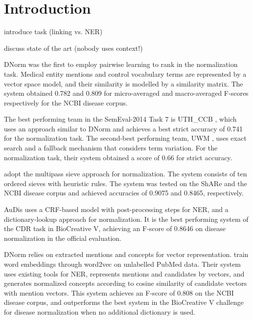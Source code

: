 \documentclass{bioinfo}
\begin{document}
\section{Introduction}

introduce task (linking vs. NER)

discuss state of the art (nobody uses context!)



DNorm \citep{leaman-et-al:2013} was the first to employ pairwise learning to rank in the normalization task.
Medical entity mentions and control vocabulary terms are represented by a vector space model, and their similarity is modelled by a similarity matrix.
The system obtained 0.782 and 0.809 for micro-averaged and macro-averaged F-scores respectively for the NCBI disease corpus.  %

The best performing team in the SemEval-2014 Task 7 is UTH\_CCB \citep{zhang-et-al:2014:SemEval}, which uses an approach similar to DNorm and achieves a best strict accuracy of 0.741 for the normalization task.  %
The second-best performing team, UWM \citep{ghiasvand-kate:2014:SemEval}, uses exact search and a fallback mechanism that considers term variation.
For the normalization task, their system obtained a score of 0.66 for strict accuracy.  %

\cite{dsouza-ng:2015:ACL-IJCNLP} adopt the multipass sieve approach for normalization.
The system consists of ten ordered sieves with heuristic rules.
The system was tested on the ShARe and the NCBI disease corpus and achieved accuracies of 0.9075 and 0.8465, respectively.

AuDis \citep{lee-et-al:2016} uses a CRF-based model with post-processing steps for NER, and a dictionary-lookup approach for normalization.
It is the best performing system of the CDR task in BioCreative V, achieving an F-score of 0.8646 on disease normalization in the official evaluation.

DNorm relies on extracted mentions and concepts for vector representation.
\cite{cho-et-al:2017} train word embeddings through word2vec on unlabelled PubMed data.
Their system uses existing tools for NER, represents mentions and candidates by vectors, and generates normalized concepts according to cosine similarity of candidate vectors with mention vectors.
This system achieves an F-score of 0.808 on the NCBI disease corpus, and outperforms the best system in the BioCreative V challenge for disease normalization when no additional dictionary is used.
\end{document}
